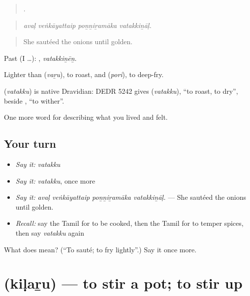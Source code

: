 \begin{quote}
   .
\end{quote}

\begin{quote}
\emph{avaḷ veṅkāyattaip poṉṉiṟamāka vatakkiṉāḷ.}
\end{quote}

\begin{quote}
She sautéed the onions until golden.
\end{quote}

Past (I …): , \emph{vatakkiṉēṉ}.

Lighter than  (\emph{vaṟu}), to roast, and  (\emph{pori}), to deep-fry.

\begin{cousinweb}
\textbf{} (\emph{vatakku}) is native Dravidian: DEDR 5242 gives  (\emph{vatakku}), \textquotedblleft{}to roast, to dry\textquotedblright{}, beside , \textquotedblleft{}to wither\textquotedblright{}.
\end{cousinweb}

\begin{grammarlens}[title={What you've built}]
One more word for describing what you lived and felt.
\end{grammarlens}

\subsection*{Your turn}
\begin{itemize}
\raggedright
  \item \emph{Say it:} \emph{vatakku}
  \item \emph{Say it:} \emph{vatakku}, once more
  \item \emph{Say it:} \emph{avaḷ veṅkāyattaip poṉṉiṟamāka vatakkiṉāḷ.} — She sautéed the onions until golden.
  \item \emph{Recall:} say the Tamil for to be cooked, then the Tamil for to temper spices, then say \emph{vatakku} again
\end{itemize}

\begin{tcolorbox}[breakable,colback=teal!4,colframe=teal!35!black,title={Before you move on}]
What does  mean? (\textquotedblleft{}To sauté; to fry lightly\textquotedblright{}.) Say it once more.
\end{tcolorbox}
\section[\texorpdfstring{\ta{கிளறு} (kiḷaṟu)}{கிளறு (kiḷaṟu)}]{ (kiḷaṟu) — to stir a pot; to stir up}

